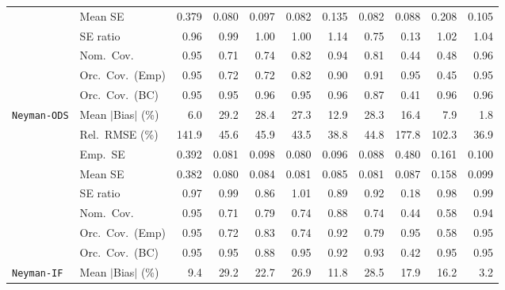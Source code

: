 \begin{landscape}
\begin{longtable}{llrrrrrrrrr}
 & Mean SE & 0.379 & 0.080 & 0.097 & 0.082 & 0.135 & 0.082 & 0.088 & 0.208 & 0.105 \\
 & SE ratio & 0.96 & \cellcolor{ranktwo}0.99 & \cellcolor{rankone}1.00 & \cellcolor{rankone}1.00 & 1.14 & 0.75 & 0.13 & \cellcolor{rankthree}1.02 & 1.04 \\
 & Nom.\ Cov. & \cellcolor{rankone}0.95 & 0.71 & 0.74 & \cellcolor{rankthree}0.82 & \cellcolor{ranktwo}0.94 & 0.81 & 0.44 & 0.48 & \cellcolor{ranktwo}0.96 \\
 & Orc.\ Cov.\ (Emp) & \cellcolor{rankone}0.95 & 0.72 & 0.72 & 0.82 & \cellcolor{rankthree}0.90 & \cellcolor{ranktwo}0.91 & \cellcolor{rankone}0.95 & 0.45 & \cellcolor{rankone}0.95 \\
 & Orc.\ Cov.\ (BC) & \cellcolor{rankone}0.95 & \cellcolor{rankone}0.95 & \cellcolor{ranktwo}0.96 & \cellcolor{rankone}0.95 & \cellcolor{ranktwo}0.96 & \cellcolor{rankthree}0.87 & 0.41 & \cellcolor{ranktwo}0.96 & \cellcolor{ranktwo}0.96 \\
\addlinespace[2pt]
\quad \texttt{Neyman-ODS} & Mean $|$Bias$|$ (\%) & \cellcolor{ranktwo}6.0 & 29.2 & 28.4 & 27.3 & 12.9 & 28.3 & 16.4 & \cellcolor{rankthree}7.9 & \cellcolor{rankone}1.8 \\
 & Rel.\ RMSE (\%) & 141.9 & 45.6 & 45.9 & \cellcolor{rankthree}43.5 & \cellcolor{ranktwo}38.8 & 44.8 & 177.8 & 102.3 & \cellcolor{rankone}36.9 \\
 & Emp.\ SE & 0.392 & 0.081 & 0.098 & 0.080 & 0.096 & 0.088 & 0.480 & 0.161 & 0.100 \\
 & Mean SE & 0.382 & 0.080 & 0.084 & 0.081 & 0.085 & 0.081 & 0.087 & 0.158 & 0.099 \\
 & SE ratio & \cellcolor{rankthree}0.97 & \cellcolor{rankone}0.99 & 0.86 & \cellcolor{rankone}1.01 & 0.89 & 0.92 & 0.18 & \cellcolor{ranktwo}0.98 & \cellcolor{rankone}0.99 \\
 & Nom.\ Cov. & \cellcolor{rankone}0.95 & 0.71 & 0.79 & 0.74 & \cellcolor{rankthree}0.88 & 0.74 & 0.44 & 0.58 & \cellcolor{ranktwo}0.94 \\
 & Orc.\ Cov.\ (Emp) & \cellcolor{rankone}0.95 & 0.72 & \cellcolor{rankthree}0.83 & 0.74 & \cellcolor{ranktwo}0.92 & 0.79 & \cellcolor{rankone}0.95 & 0.58 & \cellcolor{rankone}0.95 \\
 & Orc.\ Cov.\ (BC) & \cellcolor{rankone}0.95 & \cellcolor{rankone}0.95 & 0.88 & \cellcolor{rankone}0.95 & \cellcolor{rankthree}0.92 & \cellcolor{ranktwo}0.93 & 0.42 & \cellcolor{rankone}0.95 & \cellcolor{rankone}0.95 \\
\addlinespace[2pt]
\quad \texttt{Neyman-IF} & Mean $|$Bias$|$ (\%) & \cellcolor{ranktwo}9.4 & 29.2 & 22.7 & 26.9 & \cellcolor{rankthree}11.8 & 28.5 & 17.9 & 16.2 & \cellcolor{rankone}3.2 \\

\end{longtable}
\end{landscape}
